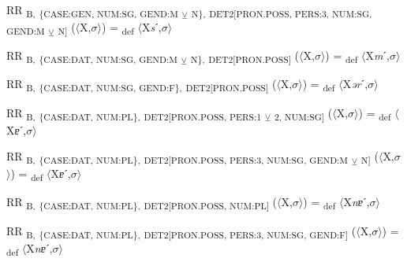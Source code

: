 {\begin{exe}
 RR \textsubscript{B,} \textsubscript{\{CASE:GEN, NUM:SG, GEND:M} \textsubscript{${\veebar}$}\textsubscript{ N\},} \textsubscript{DET2[PRON.POSS, PERS:3, NUM:SG, GEND:M} \textsubscript{${\veebar}$}\textsubscript{ N]} ($\langle$X,$\sigma $$\rangle$) = \textsubscript{def} $\langle$X\textit{s}ˊ,$\sigma $$\rangle$
\end{exe}

\begin{exe}
 RR \textsubscript{B,} \textsubscript{\{CASE:DAT, NUM:SG, GEND:M} \textsubscript{${\veebar}$}\textsubscript{ N\},} \textsubscript{DET2[PRON.POSS]} ($\langle$X,$\sigma $$\rangle$) = \textsubscript{def} $\langle$X\textit{m}ˊ,$\sigma $$\rangle$
\end{exe}

\begin{exe}
 RR \textsubscript{B,} \textsubscript{\{CASE:DAT, NUM:SG, GEND:F\},} \textsubscript{DET2[PRON.POSS]} ($\langle$X,$\sigma $$\rangle$) = \textsubscript{def} $\langle$X\textit{ər}ˊ,$\sigma $$\rangle$
\end{exe}

\begin{exe}
 RR \textsubscript{B,} \textsubscript{\{CASE:DAT, NUM:PL\},} \textsubscript{DET2[PRON.POSS, PERS:1} \textsubscript{${\veebar}$}\textsubscript{ 2, NUM:SG]} ($\langle$X,$\sigma $$\rangle$) = \textsubscript{def} $\langle$X\textit{ɐ}ˊ,$\sigma $$\rangle$
\end{exe}

\begin{exe}
 RR \textsubscript{B,} \textsubscript{\{CASE:DAT, NUM:PL\},} \textsubscript{DET2[PRON.POSS, PERS:3, NUM:SG, GEND:M} \textsubscript{${\veebar}$}\textsubscript{ N]} ($\langle$X,$\sigma $$\rangle$) = \textsubscript{def} $\langle$X\textit{ɐ}ˊ,$\sigma $$\rangle$
\end{exe}

\begin{exe}
 RR \textsubscript{B,} \textsubscript{\{CASE:DAT, NUM:PL\},} \textsubscript{DET2[PRON.POSS, NUM:PL]} ($\langle$X,$\sigma $$\rangle$) = \textsubscript{def} $\langle$X\textit{nɐ}ˊ,$\sigma $$\rangle$
\end{exe}

\begin{exe}
 RR \textsubscript{B,} \textsubscript{\{CASE:DAT, NUM:PL\},} \textsubscript{DET2[PRON.POSS, PERS:3, NUM:SG, GEND:F]} ($\langle$X,$\sigma $$\rangle$) = \textsubscript{def} $\langle$X\textit{nɐ}ˊ,$\sigma $$\rangle$
\end{exe}

}
